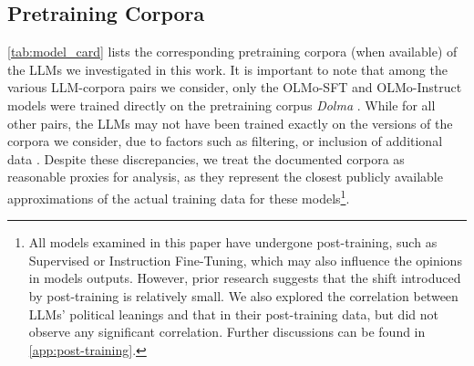 \subsection{Pretraining Corpora}
\autoref{tab:model_card} lists the corresponding pretraining corpora (when available) of the LLMs we investigated in this work. It is important to note that among the various LLM-corpora pairs we consider, only the OLMo-SFT and OLMo-Instruct models were trained directly on the pretraining corpus \textit{Dolma} \cite{soldaini-etal-2024-dolma}. While for all other pairs, the LLMs may not have been trained exactly on the versions of the corpora we consider, due to factors such as filtering, or inclusion of additional data \cite{elazar2024whats}. Despite these discrepancies, we treat the documented corpora as reasonable proxies for analysis, as they represent the closest publicly available approximations of the actual training data for these models\footnote{All models examined in this paper have undergone post-training, such as Supervised or Instruction Fine-Tuning, which may also influence the opinions in models outputs. However, prior research \cite{feng-etal-2023-pretraining} suggests that the shift introduced by post-training is relatively small. We also explored the correlation between LLMs' political leanings and that in their post-training data, but did not observe any significant correlation. Further discussions can be found in \autoref{app:post-training}.}.




